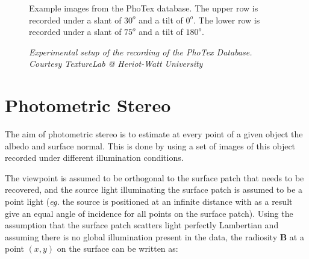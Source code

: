 \begin{figure}[htbp!]
	\begin{center}

	\end{center}
	\caption{Example images from the PhoTex database. The upper row is recorded under a slant of $30^o$ and a tilt of $0^o$. The lower row is recorded under a slant of $75^o$ and a tilt of $180^o$.}
	\label{fig:PhoTexExamples}
\end{figure}


\begin{figure}[htbp!]
	\begin{center}
	\end{center}
	\caption{\textit{Experimental setup of the recording of the PhoTex Database. Courtesy TextureLab @ Heriot-Watt University}}
	\label{fig:PHOTEX_SETUP}
\end{figure}

\section{Photometric Stereo}\label{sec:PhotometricStereo}
The aim of photometric stereo is to estimate at every point of a given object the albedo and surface normal. This is done by using a set of images of this object recorded under different illumination conditions. 

The viewpoint is assumed to be orthogonal to the surface patch that needs to be recovered, and the source light illuminating the surface patch is assumed to be a point light (\textit{eg.} the source is positioned at an infinite distance with as a result give an equal angle of incidence for all points on the surface patch). Using the assumption that the surface patch scatters light perfectly Lambertian and assuming there is no global illumination present in the data, the radiosity \textbf{B} at a point $(x, y)$ on the surface can be written as:

